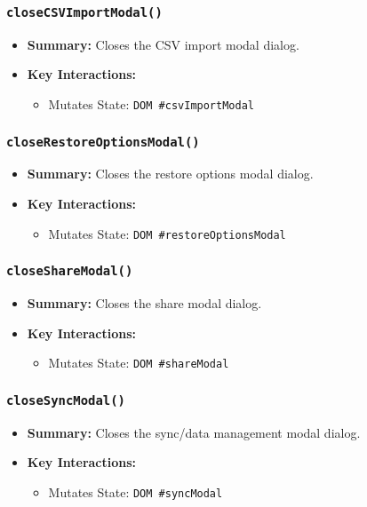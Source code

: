 \documentclass[11pt,letterpaper]{article}
\begin{document}
\subsubsection{\texttt{closeCSVImportModal()}}
\begin{itemize}
    \item \textbf{Summary:} Closes the CSV import modal dialog.
    \item \textbf{Key Interactions:}
    \begin{itemize}
        \item Mutates State: \texttt{DOM \#csvImportModal}
    \end{itemize}
\end{itemize}

\subsubsection{\texttt{closeRestoreOptionsModal()}}
\begin{itemize}
    \item \textbf{Summary:} Closes the restore options modal dialog.
    \item \textbf{Key Interactions:}
    \begin{itemize}
        \item Mutates State: \texttt{DOM \#restoreOptionsModal}
    \end{itemize}
\end{itemize}

\subsubsection{\texttt{closeShareModal()}}
\begin{itemize}
    \item \textbf{Summary:} Closes the share modal dialog.
    \item \textbf{Key Interactions:}
    \begin{itemize}
        \item Mutates State: \texttt{DOM \#shareModal}
    \end{itemize}
\end{itemize}

\subsubsection{\texttt{closeSyncModal()}}
\begin{itemize}
    \item \textbf{Summary:} Closes the sync/data management modal dialog.
    \item \textbf{Key Interactions:}
    \begin{itemize}
        \item Mutates State: \texttt{DOM \#syncModal}
    \end{itemize}
\end{itemize}
\end{document}
